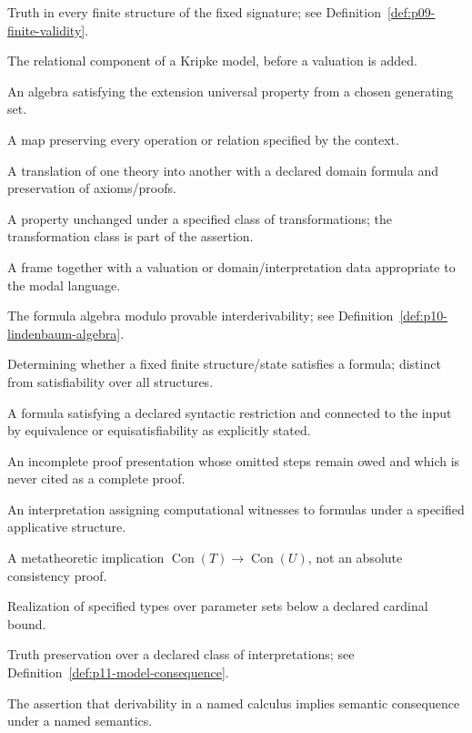 \begin{description}[style=nextline,leftmargin=0pt]
\item[finite validity] Truth in every finite structure of the fixed signature;
see Definition~\ref{def:p09-finite-validity}.
\item[frame] The relational component of a Kripke model, before a valuation is
added.
\item[free algebra] An algebra satisfying the extension universal property from
a chosen generating set.
\item[homomorphism] A map preserving every operation or relation specified by
the context.
\item[interpretation of theories] A translation of one theory into another
with a declared domain formula and preservation of axioms/proofs.
\item[invariant] A property unchanged under a specified class of transformations;
the transformation class is part of the assertion.
\item[Kripke model] A frame together with a valuation or domain/interpretation
data appropriate to the modal language.
\item[Lindenbaum--Tarski algebra] The formula algebra modulo provable
interderivability; see Definition~\ref{def:p10-lindenbaum-algebra}.
\item[model checking] Determining whether a fixed finite structure/state
satisfies a formula; distinct from satisfiability over all structures.
\item[normal form] A formula satisfying a declared syntactic restriction and
connected to the input by equivalence or equisatisfiability as explicitly stated.
\item[proof sketch] An incomplete proof presentation whose omitted steps remain
owed and which is never cited as a complete proof.
\item[realizability] An interpretation assigning computational witnesses to
formulas under a specified applicative structure.
\item[relative consistency] A metatheoretic implication
\(\operatorname{Con}(T)\to\operatorname{Con}(U)\), not an absolute consistency proof.
\item[saturation] Realization of specified types over parameter sets below a
declared cardinal bound.
\item[semantic consequence] Truth preservation over a declared class of
interpretations; see Definition~\ref{def:p11-model-consequence}.
\item[soundness] The assertion that derivability in a named calculus implies
semantic consequence under a named semantics.

\end{description}
